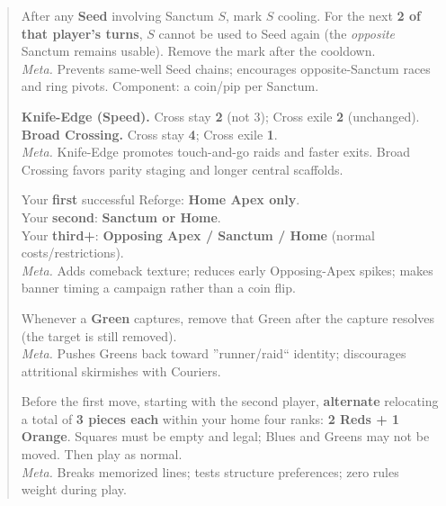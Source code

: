 \documentclass[11pt]{article}
\begin{document}
\begin{quote}
\begin{rulevariant}[title={Sanctum Cooldown (Well Goes Dry)}]
After any \textbf{Seed} involving Sanctum $S$, mark $S$ cooling. For the next \textbf{2 of that player's turns}, $S$ cannot be used to Seed again (the \emph{opposite} Sanctum remains usable). Remove the mark after the cooldown.\\
\textit{Meta.} Prevents same-well Seed chains; encourages opposite-Sanctum races and ring pivots. Component: a coin/pip per Sanctum.
\end{rulevariant}

\begin{rulevariant}[title={Cross Knife-Edge / Broad Crossing (CF Timers)}]
\textbf{Knife-Edge (Speed).} Cross stay \textbf{2} (not 3); Cross exile \textbf{2} (unchanged).\\
\textbf{Broad Crossing.} Cross stay \textbf{4}; Cross exile \textbf{1}.\\
\textit{Meta.} Knife-Edge promotes touch-and-go raids and faster exits. Broad Crossing favors parity staging and longer central scaffolds.
\end{rulevariant}

\begin{rulevariant}[title={Reforge Ladder (Placement Unlocks)}]
Your \textbf{first} successful Reforge: \textbf{Home Apex only}.\\
Your \textbf{second}: \textbf{Sanctum or Home}.\\
Your \textbf{third+}: \textbf{Opposing Apex / Sanctum / Home} (normal costs/restrictions).\\
\textit{Meta.} Adds comeback texture; reduces early Opposing-Apex spikes; makes banner timing a campaign rather than a coin flip.
\end{rulevariant}

\begin{rulevariant}[title={Spent Courier (Greens Trade Themselves)}]
Whenever a \textbf{Green} captures, remove that Green after the capture resolves (the target is still removed).\\
\textit{Meta.} Pushes Greens back toward ''runner/raid`` identity; discourages attritional skirmishes with Couriers.
\end{rulevariant}

\begin{rulevariant}[title={Opening Draft (Set-Piece Tuning)}]
Before the first move, starting with the second player, \textbf{alternate} relocating a total of \textbf{3 pieces each} within your home four ranks: \textbf{2 Reds + 1 Orange}. Squares must be empty and legal; Blues and Greens may not be moved. Then play as normal.\\
\textit{Meta.} Breaks memorized lines; tests structure preferences; zero rules weight during play.
\end{rulevariant}


\end{quote}
\end{document}
